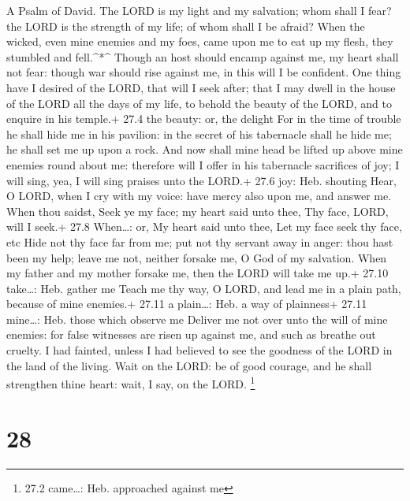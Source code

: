 A Psalm of David.  The LORD is my light and my salvation;
whom shall I fear? the LORD is the strength of my life; of whom shall I
be afraid?  When the wicked, even mine enemies and my foes,
came upon me to eat up my flesh, they stumbled and fell.\^{}*\^{}
 Though an host should encamp against me, my heart shall not
fear: though war should rise against me, in this will I be confident.
 One thing have I desired of the LORD, that will I seek
after; that I may dwell in the house of the LORD all the days of my
life, to behold the beauty of the LORD, and to enquire in his temple.+
27.4 the beauty: or, the delight  For in the time of trouble
he shall hide me in his pavilion: in the secret of his tabernacle shall
he hide me; he shall set me up upon a rock.  And now shall
mine head be lifted up above mine enemies round about me: therefore will
I offer in his tabernacle sacrifices of joy; I will sing, yea, I will
sing praises unto the LORD.+ 27.6 joy: Heb. shouting  Hear,
O LORD, when I cry with my voice: have mercy also upon me, and answer
me.  When thou saidst, Seek ye my face; my heart said unto
thee, Thy face, LORD, will I seek.+ 27.8 When\ldots: or, My heart said
unto thee, Let my face seek thy face, etc  Hide not thy face
far from me; put not thy servant away in anger: thou hast been my help;
leave me not, neither forsake me, O God of my salvation. 
When my father and my mother forsake me, then the LORD will take me up.+
27.10 take\ldots: Heb. gather me  Teach me thy way, O LORD,
and lead me in a plain path, because of mine enemies.+ 27.11 a
plain\ldots: Heb. a way of plainness+ 27.11 mine\ldots: Heb. those which
observe me  Deliver me not over unto the will of mine
enemies: for false witnesses are risen up against me, and such as
breathe out cruelty.  I had fainted, unless I had believed
to see the goodness of the LORD in the land of the living. 
Wait on the LORD: be of good courage, and he shall strengthen thine
heart: wait, I say, on the LORD. \footnote{27.2 came\ldots: Heb.
  approached against me}

\hypertarget{section-27}{%
\section{28}\label{section-27}}

